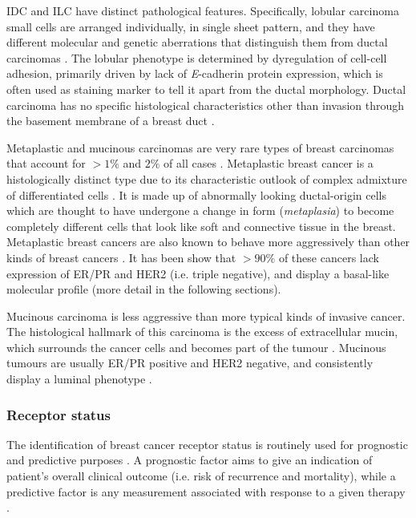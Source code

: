   IDC and ILC have distinct pathological features. Specifically, lobular carcinoma small cells are arranged individually, in single sheet pattern, and they have different molecular and genetic aberrations that distinguish them from ductal carcinomas \cite{weigelt2010molecular}. The lobular phenotype is determined by dyregulation of cell-cell adhesion, primarily driven by lack of \textit{E}-cadherin protein expression, which is often used as staining marker to tell it apart from the ductal morphology\cite{Ciriello2015ComprehensiveCancer, Abdelmessieh2016BreastOverview}. Ductal carcinoma has no specific histological characteristics other than invasion through the basement membrane of a breast duct \cite{Weigelt2008RefinementTypes}. 
   
    Metaplastic and mucinous carcinomas are very rare types of breast carcinomas that account for $>1\%$ and $2\%$ of all cases  \cite{Makki2015DiversityRelevance}. 
    Metaplastic breast cancer is a histologically distinct type due to its characteristic outlook of complex admixture of differentiated cells  \cite{Makki2015DiversityRelevance}. It is made up of abnormally looking ductal-origin cells which are thought to have undergone a change in form (\textit{metaplasia}) to become completely different cells that look like soft and connective tissue in the breast. Metaplastic breast cancers are also known to  behave more aggressively than other kinds of breast cancers \cite{schwartz2013metaplastic}. 
    It has been show that $>90\%$ of these cancers lack expression of ER/PR and HER2 (i.e. triple negative), and display a basal-like molecular profile \cite{Weigelt2010a} (more detail in the following sections).


    Mucinous carcinoma is less aggressive than more typical kinds of invasive cancer. The histological hallmark of this carcinoma is the excess of extracellular mucin, which surrounds the cancer cells and becomes part of the tumour \cite{dumitru2015mucinous}.  Mucinous tumours are usually ER/PR positive and HER2 negative, and consistently display a luminal phenotype \cite{Weigelt2010a}. 
    

   
    \subsubsection{Receptor status}
    
    The identification of breast cancer receptor status is routinely used for prognostic and predictive  purposes \cite{Zaha2014}. A prognostic factor aims to give an indication of patient's overall clinical outcome (i.e. risk of recurrence and mortality), while a predictive factor is any measurement associated with response to a given therapy \cite{cianfrocca2004prognostic}. 
    
